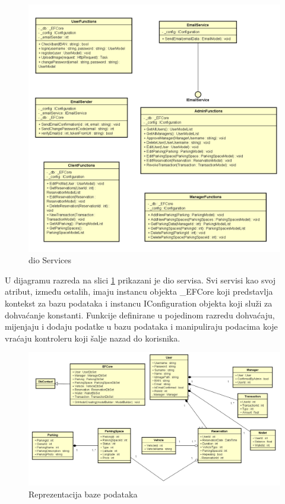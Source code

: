 				\pagebreak
		
			
			\begin{figure}[h]
				\centering
				\includegraphics[width=\textwidth,keepaspectratio]{slike/progi3_1.png}
				\caption{dio Services}
				\label{fig:services}
			\end{figure}
			
				\pagebreak
			
			{U dijagramu razreda na slici \ref{fig:services} prikazani je dio servisa. Svi servisi kao svoj atribut, između ostalih, imaju instancu objekta \_EFCore koji predstavlja kontekst za bazu podataka i instancu IConfiguration objekta koji služi za dohvaćanje konstanti. Funkcije definirane u pojedinom razredu dohvaćaju, mijenjaju i dodaju podatke u bazu podataka i manipuliraju podacima koje vraćaju kontroleru koji šalje nazad do korisnika.}
				\pagebreak
			
			\begin{figure}[h]
				\centering
				\includegraphics[width=\textwidth,keepaspectratio]{slike/progi2_1.png}
				\caption{Reprezentacija baze podataka}
				\label{fig:repr}
			\end{figure}
			
